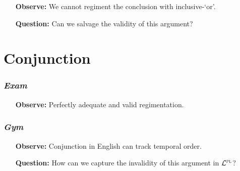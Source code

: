\documentclass[a4paper, 11pt]{article} %
\begin{document}
\begin{itemize}[leftmargin=1in,labelsep=.15in] %
  \item[\bf Observe:] We cannot regiment the conclusion with inclusive-`or'.
  \item[\bf Question:] Can we salvage the validity of this argument?
\end{itemize}





\section*{Conjunction}

\subsubsection*{\it \textbf{Exam}}

\begin{earg}
\end{earg}

\begin{itemize}[leftmargin=1in,labelsep=.15in] %
  \item[\bf Observe:] Perfectly adequate and valid regimentation.
\end{itemize}




\subsubsection*{\it \textbf{Gym}}

\begin{earg}
\end{earg}

\begin{itemize}[leftmargin=1in,labelsep=.15in] %
  \item[\bf Observe:] Conjunction in English can track temporal order.
  \item[\bf Question:] How can we capture the invalidity of this argument in $\mathcal{L}^{\textsc{pl}}$?
\end{itemize}







%
\end{document}
